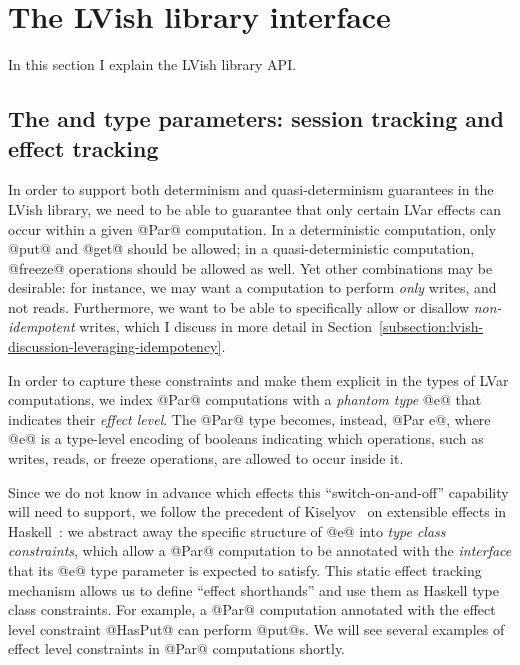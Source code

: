 \section{The LVish library interface}\label{s:lvish-api}

In this section I explain the LVish library API.



\subsection{The  and  type parameters: session tracking and effect tracking}

In order to support both determinism and quasi-determinism guarantees
in the LVish library, we need to be able to guarantee that only
certain LVar effects can occur within a given @Par@ computation.  In a
deterministic computation, only @put@ and @get@ should be allowed; in
a quasi-deterministic computation, @freeze@ operations should be
allowed as well.  Yet other combinations may be desirable: for
instance, we may want a computation to perform \emph{only} writes, and
not reads.  Furthermore, we want to be able to specifically allow or
disallow \emph{non-idempotent} writes, which I discuss in more detail
in Section~\ref{subsection:lvish-discussion-leveraging-idempotency}.

In order to capture these constraints and make them explicit in the
types of LVar computations, we index @Par@ computations with a
\emph{phantom type} @e@ that indicates their \emph{effect level}.  The
@Par@ type becomes, instead, @Par e@, where @e@ is a type-level
encoding of booleans indicating which operations, such as writes,
reads, or freeze operations, are allowed to occur inside it.

Since we do not know in advance which effects this
``switch-on-and-off'' capability will need to support, we follow the
precedent of Kiselyov \etal~on extensible effects in
Haskell~\cite{oleg-amr-haskell-2013}: we abstract away the specific
structure of @e@ into \emph{type class constraints}, which allow a
@Par@ computation to be annotated with the \emph{interface} that its
@e@ type parameter is expected to satisfy.  This static effect
tracking mechanism allows us to define ``effect shorthands'' and use
them as Haskell type class constraints.  For example, a @Par@
computation annotated with the effect level constraint @HasPut@ can
perform @put@s.  We will see several examples of effect level
constraints in @Par@ computations shortly.

